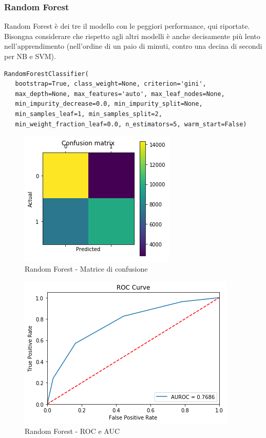 \documentclass[hidelinks, 12pt]{article}
\begin{document}
\subsubsection{Random Forest}

Random Forest è dei tre il modello con le peggiori performance, qui riportate. Bisongna considerare che rispetto agli altri modelli è anche decisamente più lento nell'apprendimento (nell'ordine di un paio di minuti, contro una decina di secondi per NB e SVM).

\begin{verbatim}
RandomForestClassifier(
   bootstrap=True, class_weight=None, criterion='gini',
   max_depth=None, max_features='auto', max_leaf_nodes=None,
   min_impurity_decrease=0.0, min_impurity_split=None,
   min_samples_leaf=1, min_samples_split=2,
   min_weight_fraction_leaf=0.0, n_estimators=5, warm_start=False)
\end{verbatim}

\begin{figure}[H]
	\centering
	\includegraphics[scale=0.6]{images/05_00_rf_confmat.png}
	\caption[Random Forest - Matrice di confusione]{Random Forest - Matrice di confusione}
	\label{fig:rf-cm}
\end{figure}

\begin{figure}[H]
\centering
\includegraphics[scale=0.6]{images/05_00_rf_auroc.png}
\caption[Random Forest - ROC e AUC]{Random Forest - ROC e AUC}
\label{fig:rf-auroc}
\end{figure}
\end{document}
